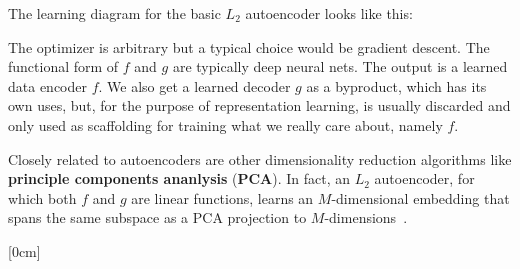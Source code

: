 The learning diagram for the basic $L_2$ autoencoder looks like this:
\begin{center}
\end{center}
The optimizer is arbitrary but a typical choice would be gradient descent. The functional form of $f$ and $g$ are typically deep neural nets. The output is a learned data encoder $f$. We also get a learned decoder $g$ as a byproduct, which has its own uses, but, for the purpose of representation learning, is usually discarded and only used as scaffolding for training what we really care about, namely $f$.

Closely related to autoencoders are other dimensionality reduction algorithms like \textbf{principle components ananlysis} (\textbf{PCA}). In fact, an $L_2$ autoencoder, for which both $f$ and $g$ are linear functions, learns an $M$-dimensional embedding that spans the same subspace as a PCA projection to $M$-dimensions~\cite{bourlard1988auto}.

[0cm]


